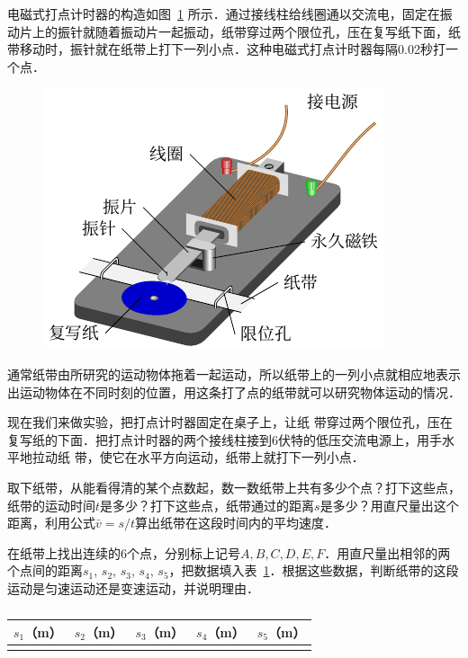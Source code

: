 电磁式打点计时器的构造如图~\ref{fig_A_10-8} 所示．通过接线柱给线圈通以交流电，固定在振动片上的振针就随着振动片一起振动，纸带穿过两个限位孔，压在复写纸下面，纸带移动时，振针就在纸带上打下一列小点．这种电磁式打点计时器每隔0.02秒打一个点．
\begin{figure}[htbp]
    \centering
    \includegraphics{fig/A/10-8.pdf}
    \caption{}\label{fig_A_10-8}
\end{figure}

通常纸带由所研究的运动物体拖着一起运动，所以纸带上的一列小点就相应地表示出运动物体在不同时刻的位置，用这条打了点的纸带就可以研究物体运动的情况．

现在我们来做实验，把打点计时器固定在桌子上，让纸
带穿过两个限位孔，压在复写纸的下面．把打点计时器的两个接线柱接到6伏特的低压交流电源上，用手水平地拉动纸	
带，使它在水平方向运动，纸带上就打下一列小点．

取下纸带，从能看得清的某个点数起，数一数纸带上共有多少个点？打下这些点，纸带的运动时间$t$是多少？打下这些点，纸带通过的距离$s$是多少？用直尺量出这个距离，利用公式$\bar v=s/t$算出纸带在这段时间内的平均速度．

在纸带上找出连续的6个点，分别标上记号$A,B,C,D,E,F$．用直尺量出相邻的两个点间的距离$s_1$, $s_2$, $s_3$, $s_4$, $s_5$，把数据填入表~\ref{tab_A_10-3}．根据这些数据，判断纸带的这段运动是匀速运动还是变速运动，并说明理由．
\begin{table}[htbp]
	\centering
    \begin{tabular}{c|c|c|c|c}
        \hline
        $s_1$（m）&$s_2$（m）&$s_3$（m）&$s_4$（m）&$s_5$（m）\\
        \hline
		&&&&\\
        \hline
    \end{tabular}
    \caption{}\label{tab_A_10-3}
\end{table}

